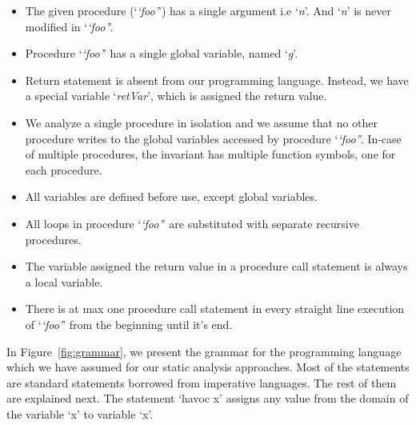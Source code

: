 \documentclass{llncs}
\newcommand{\foo}{\textit{`foo'}}
\newcommand{\retVar}{\textit{retVar}}
\newcommand{\n}{\textit{n}}
\newcommand{\g}{\textit{g}}
\begin{document}
\begin{itemize}
\item The given procedure (`\foo') has a single argument i.e `\n'. And
  `\n' is never modified in `\foo'.
\item Procedure `\foo' has a single global variable, named `\g'.
\item Return statement is absent from our programming language. Instead,
  we have a special variable `\retVar', which is assigned the return
  value.
\item We analyze a single procedure in isolation and we assume that no
  other procedure writes to the global variables accessed by procedure
  `\foo'. In-case of multiple procedures, the invariant has multiple
  function symbols, one for each procedure. 
\item All variables are defined before use, except global variables.
\item All loops in procedure `\foo' are substituted with 
  separate recursive procedures.
\item The variable assigned the return value in a procedure call
  statement is always a local variable.
\item There is at max one procedure call statement in every straight line
  execution of `\foo' from the beginning until it's end.
  \end{itemize}

In Figure~\ref{fig:grammar}, we present the grammar for the
programming language which we have assumed for our static analysis
approaches.  Most of the statements are standard statements borrowed
from imperative languages. The rest of them are explained next. The
statement `havoc x' assigns any value from the domain of the variable
`x' to variable `x'.
\end{document}
